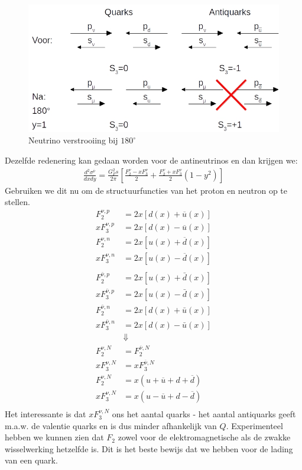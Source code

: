 \documentclass[../main.tex]{subfiles}
\begin{document}
\begin{figure}[h]
    \centering
    \includegraphics[width=0.8\linewidth]{DIS_nucleon_structuur_pdf/neutr_scat_f_3.jpg}
    \caption{Neutrino verstrooiing bij $180^\circ$}%
    \label{fig:neutr_scat_f_3}
\end{figure}

Dezelfde redenering kan gedaan worden voor de antineutrinos en dan krijgen we:
\begin{equation}
    \begin{aligned}
        \label{eq:struct_func_nucleon_zwak_anti}
        \frac{d^2 \sigma^{\overline \nu}}{dxdy} = \frac{G_F^2 s}{2\pi} \left[ \frac{F_2^\nu-xF_3^\nu}{2} + \frac{F_2^\nu+xF_3^\nu}{2}(1-y^2) \right]
    \end{aligned}
\end{equation}
Gebruiken we dit nu om de structuurfuncties van het proton en neutron op te stellen.
\begin{equation}
    \begin{aligned}
        \label{eq:struct_func_neutrino_proton_neutron}
        F_2^{\nu, p} &= 2x[d(x)+\overline u(x)]\\
        xF_3^{\nu, p} &= 2x[d(x)-\overline u(x)]\\
        F_2^{\nu, n} &= 2x[u(x)+\overline d(x)]\\
        xF_3^{\nu, n} &= 2x[u(x)-\overline d(x)]\\
        \\
        F_{2}^{\bar{\nu}, p} &=2 x[u(x)+\bar{d}(x)] \\
        x F_{3}^{\bar{\nu}, p} &=2 x[u(x)-\bar{d}(x)] \\
        F_{2}^{\bar{\nu}, n} &=2 x[d(x)+\bar{u}(x)] \\
        x F_{3}^{\bar{\nu}, n} &=2 x[d(x)-\bar{u}(x)]\\
                      &\Downarrow\\
        F_2^{\nu, N} &= F_2^{\overline \nu, N}\\
        xF_3^{\nu, N} &= xF_3^{\overline \nu, N}\\
        F_2^{\nu, N} &= x(u+\overline u+d+\overline d)\\
        xF_3^{\nu, N} &= x(u-\overline u+d-\overline d)\\
    \end{aligned}
\end{equation}
Het interessante is dat $xF_3^{\nu, N}$ ons het aantal quarks - het aantal antiquarks geeft m.a.w. de valentie quarks en is dus minder afhankelijk van $Q$. Experimenteel hebben we kunnen zien dat $F_2$ zowel voor de elektromagnetische als de zwakke wisselwerking hetzelfde is. Dit is het beste bewijs dat we hebben voor de lading van een quark.
\end{document}
